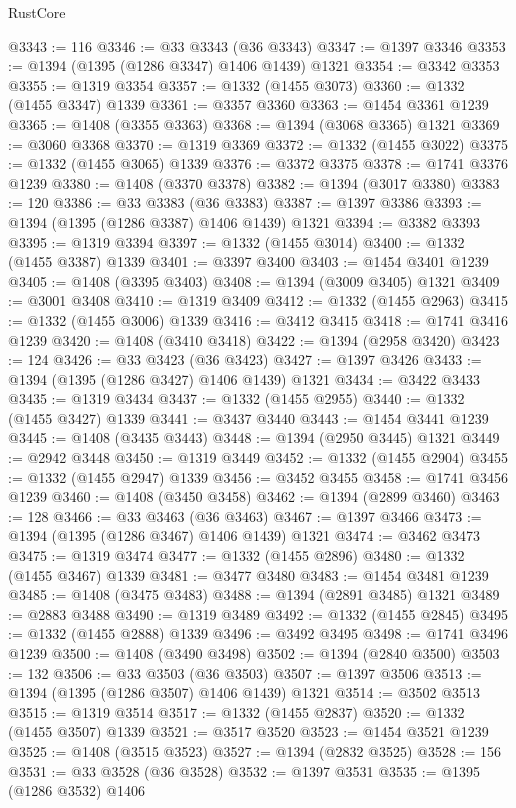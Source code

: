\begin{lexlean}{RustCore}
\begin{coremodule}
@3343 := 116
@3346 := @33 @3343 (@36 @3343)
@3347 := @1397 @3346
@3353 := @1394 (@1395 (@1286 @3347) @1406 @1439) @1321
@3354 := @3342 @3353
@3355 := @1319 @3354
@3357 := @1332 (@1455 @3073)
@3360 := @1332 (@1455 @3347) @1339
@3361 := @3357 @3360
@3363 := @1454 @3361 @1239
@3365 := @1408 (@3355 @3363)
@3368 := @1394 (@3068 @3365) @1321
@3369 := @3060 @3368
@3370 := @1319 @3369
@3372 := @1332 (@1455 @3022)
@3375 := @1332 (@1455 @3065) @1339
@3376 := @3372 @3375
@3378 := @1741 @3376 @1239
@3380 := @1408 (@3370 @3378)
@3382 := @1394 (@3017 @3380)
@3383 := 120
@3386 := @33 @3383 (@36 @3383)
@3387 := @1397 @3386
@3393 := @1394 (@1395 (@1286 @3387) @1406 @1439) @1321
@3394 := @3382 @3393
@3395 := @1319 @3394
@3397 := @1332 (@1455 @3014)
@3400 := @1332 (@1455 @3387) @1339
@3401 := @3397 @3400
@3403 := @1454 @3401 @1239
@3405 := @1408 (@3395 @3403)
@3408 := @1394 (@3009 @3405) @1321
@3409 := @3001 @3408
@3410 := @1319 @3409
@3412 := @1332 (@1455 @2963)
@3415 := @1332 (@1455 @3006) @1339
@3416 := @3412 @3415
@3418 := @1741 @3416 @1239
@3420 := @1408 (@3410 @3418)
@3422 := @1394 (@2958 @3420)
@3423 := 124
@3426 := @33 @3423 (@36 @3423)
@3427 := @1397 @3426
@3433 := @1394 (@1395 (@1286 @3427) @1406 @1439) @1321
@3434 := @3422 @3433
@3435 := @1319 @3434
@3437 := @1332 (@1455 @2955)
@3440 := @1332 (@1455 @3427) @1339
@3441 := @3437 @3440
@3443 := @1454 @3441 @1239
@3445 := @1408 (@3435 @3443)
@3448 := @1394 (@2950 @3445) @1321
@3449 := @2942 @3448
@3450 := @1319 @3449
@3452 := @1332 (@1455 @2904)
@3455 := @1332 (@1455 @2947) @1339
@3456 := @3452 @3455
@3458 := @1741 @3456 @1239
@3460 := @1408 (@3450 @3458)
@3462 := @1394 (@2899 @3460)
@3463 := 128
@3466 := @33 @3463 (@36 @3463)
@3467 := @1397 @3466
@3473 := @1394 (@1395 (@1286 @3467) @1406 @1439) @1321
@3474 := @3462 @3473
@3475 := @1319 @3474
@3477 := @1332 (@1455 @2896)
@3480 := @1332 (@1455 @3467) @1339
@3481 := @3477 @3480
@3483 := @1454 @3481 @1239
@3485 := @1408 (@3475 @3483)
@3488 := @1394 (@2891 @3485) @1321
@3489 := @2883 @3488
@3490 := @1319 @3489
@3492 := @1332 (@1455 @2845)
@3495 := @1332 (@1455 @2888) @1339
@3496 := @3492 @3495
@3498 := @1741 @3496 @1239
@3500 := @1408 (@3490 @3498)
@3502 := @1394 (@2840 @3500)
@3503 := 132
@3506 := @33 @3503 (@36 @3503)
@3507 := @1397 @3506
@3513 := @1394 (@1395 (@1286 @3507) @1406 @1439) @1321
@3514 := @3502 @3513
@3515 := @1319 @3514
@3517 := @1332 (@1455 @2837)
@3520 := @1332 (@1455 @3507) @1339
@3521 := @3517 @3520
@3523 := @1454 @3521 @1239
@3525 := @1408 (@3515 @3523)
@3527 := @1394 (@2832 @3525)
@3528 := 156
@3531 := @33 @3528 (@36 @3528)
@3532 := @1397 @3531
@3535 := @1395 (@1286 @3532) @1406

\end{coremodule}
\end{lexlean}
